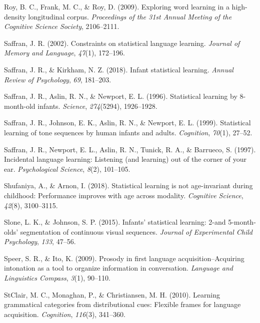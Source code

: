 \documentclass[man,mask,floatsintext]{apa6}
\begin{document}
\hypertarget{ref-roy2009exploring}{}
Roy, B. C., Frank, M. C., \& Roy, D. (2009). Exploring word learning in
a high-density longitudinal corpus. \emph{Proceedings of the 31st Annual
Meeting of the Cognitive Science Society}, 2106--2111.

\hypertarget{ref-saffran2002constraints}{}
Saffran, J. R. (2002). Constraints on statistical language learning.
\emph{Journal of Memory and Language}, \emph{47}(1), 172--196.

\hypertarget{ref-saffran2018infant}{}
Saffran, J. R., \& Kirkham, N. Z. (2018). Infant statistical learning.
\emph{Annual Review of Psychology}, \emph{69}, 181--203.

\hypertarget{ref-saffran1996statistical}{}
Saffran, J. R., Aslin, R. N., \& Newport, E. L. (1996). Statistical
learning by 8-month-old infants. \emph{Science}, \emph{274}(5294),
1926--1928.

\hypertarget{ref-saffran1999statistical}{}
Saffran, J. R., Johnson, E. K., Aslin, R. N., \& Newport, E. L. (1999).
Statistical learning of tone sequences by human infants and adults.
\emph{Cognition}, \emph{70}(1), 27--52.

\hypertarget{ref-saffran1997incidental}{}
Saffran, J. R., Newport, E. L., Aslin, R. N., Tunick, R. A., \&
Barrueco, S. (1997). Incidental language learning: Listening (and
learning) out of the corner of your ear. \emph{Psychological Science},
\emph{8}(2), 101--105.

\hypertarget{ref-shufaniya2018statistical}{}
Shufaniya, A., \& Arnon, I. (2018). Statistical learning is not
age-invariant during childhood: Performance improves with age across
modality. \emph{Cognitive Science}, \emph{42}(8), 3100--3115.

\hypertarget{ref-slone2015infants}{}
Slone, L. K., \& Johnson, S. P. (2015). Infants' statistical learning:
2-and 5-month-olds' segmentation of continuous visual sequences.
\emph{Journal of Experimental Child Psychology}, \emph{133}, 47--56.

\hypertarget{ref-speer2009prosody}{}
Speer, S. R., \& Ito, K. (2009). Prosody in first language
acquisition--Acquiring intonation as a tool to organize information in
conversation. \emph{Language and Linguistics Compass}, \emph{3}(1),
90--110.

\hypertarget{ref-clair2010learning}{}
StClair, M. C., Monaghan, P., \& Christiansen, M. H. (2010). Learning
grammatical categories from distributional cues: Flexible frames for
language acquisition. \emph{Cognition}, \emph{116}(3), 341--360.
\end{document}
